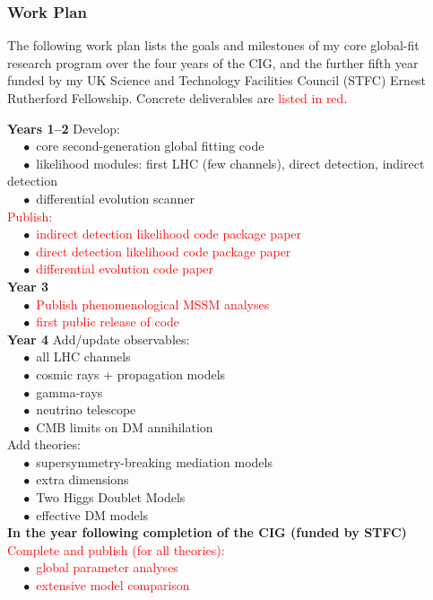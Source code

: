 \documentclass[a4paper,11pt]{article}
\begin{document}
\subsubsection{Work Plan}

The following work plan lists the goals and milestones of my core global-fit research program over the four years of the CIG, and the further fifth year funded by my UK Science and Technology Facilities Council (STFC) Ernest Rutherford Fellowship.  Concrete deliverables are \textcolor{red}{listed in red}.

\noindent\textbf{Years 1--2} Develop:\\
$\phantom{xx}\bullet$ core second-generation global fitting code\\
$\phantom{xx}\bullet$ likelihood modules: first LHC (few channels), direct detection, indirect detection\\
$\phantom{xx}\bullet$ differential evolution scanner\\
\textcolor{red}{Publish:}\\
$\phantom{xx}\bullet$ \textcolor{red}{indirect detection likelihood code package paper}\\
$\phantom{xx}\bullet$ \textcolor{red}{direct detection likelihood code package paper}\\
$\phantom{xx}\bullet$ \textcolor{red}{differential evolution code paper}\\
\noindent\textbf{Year 3}\\ 
$\phantom{xx}\bullet$ \textcolor{red}{Publish phenomenological MSSM analyses}\\
$\phantom{xx}\bullet$ \textcolor{red}{first public release of code}\\
\noindent\textbf{Year 4} Add/update observables:\\
$\phantom{xx}\bullet$ all LHC channels\\
$\phantom{xx}\bullet$ cosmic rays + propagation models\\
$\phantom{xx}\bullet$ gamma-rays\\
$\phantom{xx}\bullet$ neutrino telescope\\
$\phantom{xx}\bullet$ CMB limits on DM annihilation\\
Add theories:\\
$\phantom{xx}\bullet$ supersymmetry-breaking mediation models\\
$\phantom{xx}\bullet$ extra dimensions\\
$\phantom{xx}\bullet$ Two Higgs Doublet Models\\
$\phantom{xx}\bullet$ effective DM models\\
\noindent\textbf{In the year following completion of the CIG (funded by STFC)}\\
\textcolor{red}{Complete and publish (for all theories):}\\ 
$\phantom{xx}\bullet$ \textcolor{red}{global parameter analyses}\\
$\phantom{xx}\bullet$ \textcolor{red}{extensive model comparison}
\end{document}
